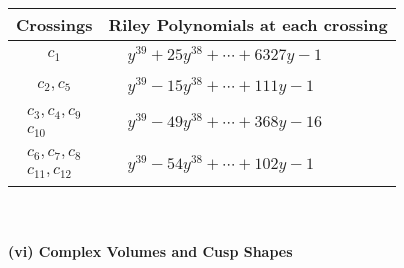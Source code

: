 \documentclass[1p]{elsarticle_modified}
\theoremstyle{definition}
\begin{document}
\begin{tabular}{m{50pt}|m{274pt}}
Crossings & \hspace{64pt}Riley Polynomials at each crossing \\
\hline $$\begin{aligned}c_{1}\end{aligned}$$&$\begin{aligned}
&y^{39}+25 y^{38}+\cdots+6327 y-1
\end{aligned}$\\
\hline $$\begin{aligned}c_{2},c_{5}\end{aligned}$$&$\begin{aligned}
&y^{39}-15 y^{38}+\cdots+111 y-1
\end{aligned}$\\
\hline $$\begin{aligned}c_{3},c_{4},c_{9}\\c_{10}\end{aligned}$$&$\begin{aligned}
&y^{39}-49 y^{38}+\cdots+368 y-16
\end{aligned}$\\
\hline $$\begin{aligned}c_{6},c_{7},c_{8}\\c_{11},c_{12}\end{aligned}$$&$\begin{aligned}
&y^{39}-54 y^{38}+\cdots+102 y-1
\end{aligned}$\\
\hline
\end{tabular}\\~\\
\newpage\flushleft \textbf{(vi) Complex Volumes and Cusp Shapes}
\end{document}
